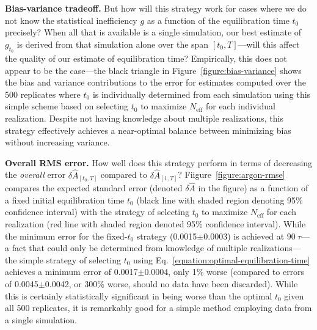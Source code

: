 \documentclass[aps,pre,twocolumn,nofootinbib,superscriptaddress,linenumbers,11point]{revtex4-1}
\begin{document}
{\bf Bias-variance tradeoff.} 
But how will this strategy work for cases where we do not know the statistical inefficiency $g$ as a function of the equilibration time $t_0$ precisely?
When all that is available is a single simulation, our best estimate of $g_{t_0}$ is derived from that simulation alone over the span $[t_0,T]$---will this affect the quality of our estimate of equilibration time?
Empirically, this does not appear to be the case---the black triangle in Figure~\ref{figure:bias-variance} shows the bias and variance contributions to the error for estimates computed over the 500 replicates where $t_0$ is individually determined from each simulation using this simple scheme based on selecting $t_0$ to maximize $N_\mathrm{eff}$ for each individual realization.
Despite not having knowledge about multiple realizations, this strategy effectively achieves a near-optimal balance between minimizing bias without increasing variance.

{\bf Overall RMS error.} 
How well does this strategy perform in terms of decreasing the \emph{overall} error $\delta \hat{A}_{[t_0,T]}$ compared to $\delta \hat{A}_{[1,T]}$?
Fiigure~\ref{figure:argon-rmse} compares the expected standard error (denoted $\delta \hat{A}$ in the figure) as a function of a fixed initial equilibration time $t_0$ (black line with shaded region denoting 95\% confidence interval) with the strategy of selecting $t_0$ to maximize $N_\mathrm{eff}$ for each realization (red line with shaded region denoted 95\% confidence interval).
While the minimum error for the fixed-$t_0$ strategy (0.0015$\pm$0.0003) is achieved at $90~\tau$---a fact that could only be determined from knowledge of multiple realizations---the simple strategy of selecting $t_0$ using Eq.~\ref{equation:optimal-equilibration-time} achieves a minimum error of 0.0017$\pm$0.0004, only 1\% worse (compared to errors of 0.0045$\pm$0.0042, or 300\% worse, should no data have been discarded).
While this is certainly statistically significant in being worse than the optimal $t_0$ given all 500 replicates, it is remarkably good for a simple method employing data from a single simulation.

\end{document}
